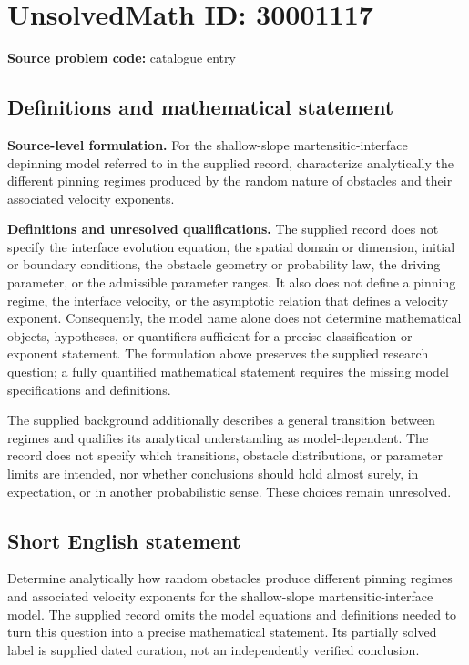 \documentclass[11pt]{article}
\begin{document}
\section*{UnsolvedMath ID: 30001117}
\textbf{Source problem code:} catalogue entry
\subsection{Definitions and mathematical statement}
\textbf{Source-level formulation.} For the shallow-slope martensitic-interface depinning model referred to in the supplied record, characterize analytically the different pinning regimes produced by the random nature of obstacles and their associated velocity exponents.

\textbf{Definitions and unresolved qualifications.} The supplied record does not specify the interface evolution equation, the spatial domain or dimension, initial or boundary conditions, the obstacle geometry or probability law, the driving parameter, or the admissible parameter ranges. It also does not define a pinning regime, the interface velocity, or the asymptotic relation that defines a velocity exponent. Consequently, the model name alone does not determine mathematical objects, hypotheses, or quantifiers sufficient for a precise classification or exponent statement. The formulation above preserves the supplied research question; a fully quantified mathematical statement requires the missing model specifications and definitions.

The supplied background additionally describes a general transition between regimes and qualifies its analytical understanding as model-dependent. The record does not specify which transitions, obstacle distributions, or parameter limits are intended, nor whether conclusions should hold almost surely, in expectation, or in another probabilistic sense. These choices remain unresolved.
\subsection{Short English statement}
Determine analytically how random obstacles produce different pinning regimes and associated velocity exponents for the shallow-slope martensitic-interface model. The supplied record omits the model equations and definitions needed to turn this question into a precise mathematical statement. Its partially solved label is supplied dated curation, not an independently verified conclusion.
\end{document}
